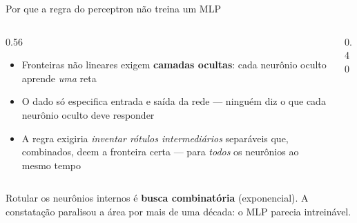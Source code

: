 \documentclass[aspectratio=169, 11pt]{beamer}
\begin{document}
\begin{frame}{Por que a regra do perceptron não treina um MLP}
  \begin{columns}[T]
    \begin{column}{0.56\textwidth}
      \begin{itemize}\setlength{\itemsep}{0.4ex}
        \item Fronteiras não lineares exigem \textbf{camadas ocultas}:
              cada neurônio oculto aprende \emph{uma} reta
        \item O dado só especifica \alert{entrada e saída da rede} — ninguém
              diz o que cada neurônio oculto deve responder
        \item A regra exigiria \emph{inventar rótulos intermediários}
              separáveis que, combinados, deem a fronteira certa —
              para \emph{todos} os neurônios ao mesmo tempo
      \end{itemize}
    \end{column}
    \begin{column}{0.40\textwidth}
      \begin{center}
      \end{center}
    \end{column}
  \end{columns}

  \begin{alertabox}
    Rotular os neurônios internos é \textbf{busca combinatória} (exponencial).
    A constatação \alert{paralisou a área por mais de uma década}: o MLP
    parecia intreinável.
  \end{alertabox}
\end{frame}
\end{document}
